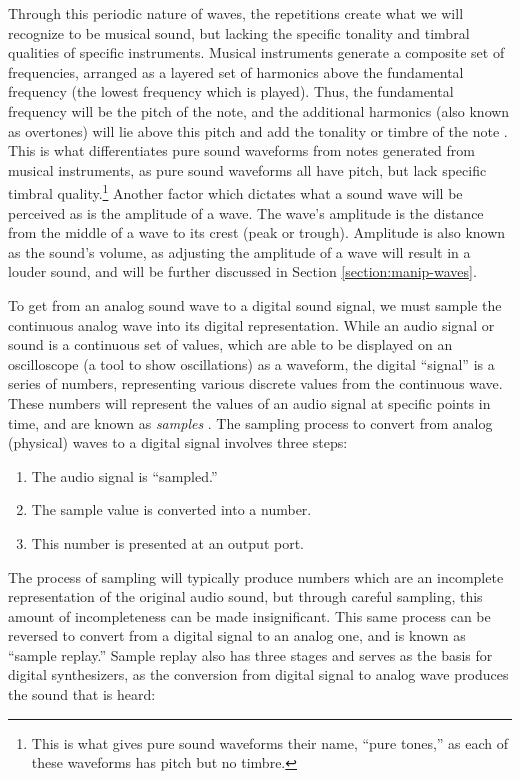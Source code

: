 Through this periodic nature of waves, the repetitions create what we will recognize to be musical sound, but lacking the specific tonality and timbral qualities of specific instruments. Musical instruments generate a composite set of frequencies, arranged as a layered set of harmonics above the fundamental frequency (the lowest frequency which is played). Thus, the fundamental frequency will be the pitch of the note, and the additional harmonics (also known as overtones) will lie above this pitch and add the tonality or timbre of the note \cite{Toft_2020}. This is what differentiates pure sound waveforms from notes generated from musical instruments, as pure sound waveforms all have pitch, but lack specific timbral quality.\footnote{This is what gives pure sound waveforms their name, ``pure tones,'' as each of these waveforms has pitch but no timbre.} Another factor which dictates what a sound wave will be perceived as is the amplitude of a wave. The wave's amplitude is the distance from the middle of a wave to its crest (peak or trough). Amplitude is also known as the sound's volume, as adjusting the amplitude of a wave will result in a louder sound, and will be further discussed in Section \ref{section:manip-waves}.

To get from an analog sound wave to a digital sound signal, we must sample the continuous analog wave into its digital representation. While an audio signal or sound is a continuous set of values, which are able to be displayed on an oscilloscope (a tool to show oscillations) as a waveform, the digital ``signal'' is a series of numbers, representing various discrete values from the continuous wave. These numbers will represent the values of an audio signal at specific points in time, and are known as \textit{samples} \cite{Russ_2012}. The sampling process to convert from analog (physical) waves to a digital signal involves three steps:

\begin{enumerate}
	\item The audio signal is ``sampled.''
	\item The sample value is converted into a number.
	\item This number is presented at an output port.
\end{enumerate}

The process of sampling will typically produce numbers which are an incomplete representation of the original audio sound, but through careful sampling, this amount of incompleteness can be made insignificant. This same process can be reversed to convert from a digital signal to an analog one, and is known as ``sample replay.'' Sample replay also has three stages and serves as the basis for digital synthesizers, as the conversion from digital signal to analog wave produces the sound that is heard:


